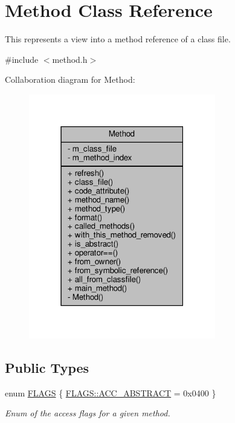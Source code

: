 \hypertarget{classMethod}{}\section{Method Class Reference}
\label{classMethod}


This represents a view into a method reference of a class file.  




{\ttfamily \#include $<$method.\+h$>$}



Collaboration diagram for Method\+:\nopagebreak
\begin{figure}[H]
\begin{center}
\leavevmode
\includegraphics[width=231pt]{classMethod__coll__graph}
\end{center}
\end{figure}
\subsection*{Public Types}
\begin{DoxyCompactItemize}
\item 
enum \hyperlink{classMethod_a142a92c7e2c79cbbedb7fd08a8a8e1ad}{F\+L\+A\+GS} \{ \hyperlink{classMethod_a142a92c7e2c79cbbedb7fd08a8a8e1adaade04c031729a1f18ba2bb86e7aeddfc}{F\+L\+A\+G\+S\+::\+A\+C\+C\+\_\+\+A\+B\+S\+T\+R\+A\+CT} = 0x0400
 \}\begin{DoxyCompactList}\small\item\em Enum of the access flags for a given method. \end{DoxyCompactList}
\end{DoxyCompactItemize}
